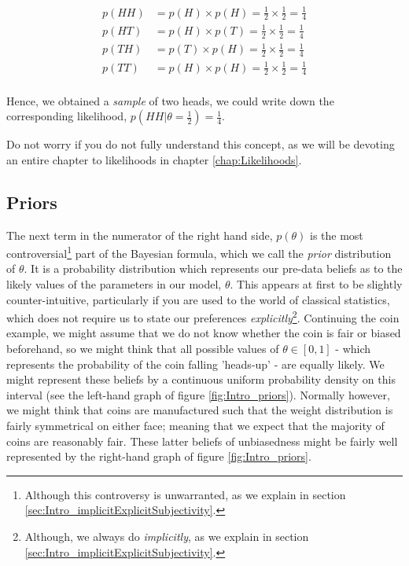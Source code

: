 \documentclass[11pt,fullpage]{book}
\begin{document}
\begin{equation}
\begin{align}
p(HH) &= p(H)\times p(H) = \frac{1}{2} \times \frac{1}{2} = \frac{1}{4}\\
p(HT) &= p(H)\times p(T) = \frac{1}{2} \times \frac{1}{2} = \frac{1}{4}\\
p(TH) &= p(T)\times p(H) = \frac{1}{2} \times \frac{1}{2} = \frac{1}{4}\\
p(TT) &= p(H)\times p(H) = \frac{1}{2} \times \frac{1}{2} = \frac{1}{4}\\
\end{align}
\end{equation}

Hence, we obtained a \textit{sample} of two heads, we could write down the corresponding likelihood, $p(HH|\theta=\frac{1}{2})=\frac{1}{4}$.

Do not worry if you do not fully understand this concept, as we will be devoting an entire chapter to likelihoods in chapter \ref{chap:Likelihoods}.

\subsection{Priors}\label{sec:Intro_priors}
The next term in the numerator of the right hand side, $p(\theta)$ is the most controversial\footnote{Although this controversy is unwarranted, as we explain in section \ref{sec:Intro_implicitExplicitSubjectivity}.} part of the Bayesian formula, which we call the \textit{prior} distribution of $\theta$. It is a probability distribution which represents our pre-data beliefs as to the likely values of the parameters in our model, $\theta$. This appears at first to be slightly counter-intuitive, particularly if you are used to the world of classical statistics, which does not require us to state our preferences \textit{explicitly}\footnote{Although, we always do \textit{implicitly}, as we explain in section \ref{sec:Intro_implicitExplicitSubjectivity}.}. Continuing the coin example, we might assume that we do not know whether the coin is fair or biased beforehand, so we might think that all possible values of $\theta\in[0,1]$ - which represents the probability of the coin falling 'heads-up' - are equally likely. We might represent these beliefs by a continuous uniform probability density on this interval (see the left-hand graph of figure \ref{fig:Intro_priors}). Normally however, we might think that coins are manufactured such that the weight distribution is fairly symmetrical on either face; meaning that we expect that the majority of coins are reasonably fair. These latter beliefs of unbiasedness might be fairly well represented by the right-hand graph of figure \ref{fig:Intro_priors}.
\end{document}
